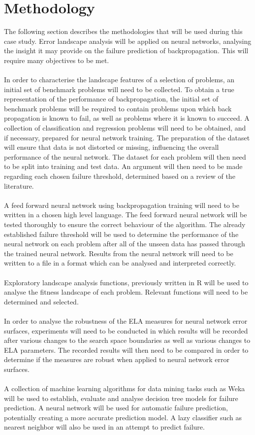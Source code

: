\documentclass[runningheads,a4paper]{llncs}
\begin{document}
\section{Methodology}

The following section describes the methodologies that will be used during this case study. Error landscape analysis will be applied on neural networks, analysing the 
insight it may provide on the failure prediction of backpropagation. This will require many objectives to be met. 
\\\\
In order to characterise the landscape features of a selection of problems, an initial set of benchmark problems will need to be collected. To obtain a true representation 
of the performance of backpropagation, the initial set of benchmark problems will be required to contain problems upon which back propagation is known to fail, as well as problems where it 
is known to succeed. A collection of classification and regression problems will need to be obtained, and if necessary, prepared for neural network training. The preparation 
of the dataset will ensure that data is not distorted or missing, influencing the overall performance of the neural network. The dataset for each problem will then need
to be split into training and test data. An argument will then need to be made regarding each chosen failure threshold, determined based on a review of the literature.
\\\\
A feed forward neural network using backpropagation training will need to be written in a chosen high level language. The feed forward neural network will be tested thoroughly 
to ensure the correct behaviour of the algorithm. The already established failure threshold will be used to determine the performance of the neural network on each problem after
all of the unseen data has passed through the trained neural network. Results from the neural network will need to be written to a file in a format which can be 
analysed and interpreted correctly.
\\\\
Exploratory landscape analysis functions, previously written in R will be used to analyse the fitness landscape of each problem. Relevant functions will need to be determined
and selected. 
\\\\
In order to analyse the robustness of the ELA measures for neural network error surfaces, experiments will need to be conducted in which results will be recorded after various changes
to the search space boundaries as well as various changes to ELA parameters. The recorded results will then need to be compared in order to determine 
if the measures are robust when applied to neural network error surfaces.
\\\\
A collection of machine learning algorithms for data mining tasks such as Weka will be used to establish, evaluate and analyse decision tree models for failure prediction.
A neural network will be used for automatic failure prediction, potentially creating a more accurate prediction model. A lazy classifier such as nearest neighbor will also be
used in an attempt to predict failure. 
\end{document}
